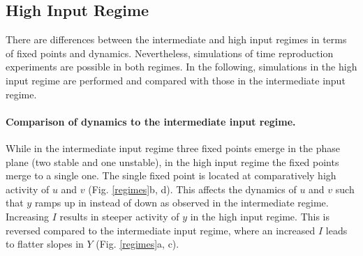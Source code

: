 \documentclass[10pt]{article}
\begin{document}
\subsection{High Input Regime}
There are differences between the intermediate and high input regimes in terms of fixed points and dynamics.
Nevertheless, simulations of time reproduction experiments are possible in both regimes. 
In the following, simulations in the high input regime are performed and compared with those in the intermediate input regime.

\paragraph{Comparison of dynamics to the intermediate input regime.}
While in the intermediate input regime three fixed points emerge in the phase plane (two stable and one unstable), in the high input regime the fixed points merge to a single one. 
The single fixed point is located at comparatively high activity of $u$ and $v$ 
(Fig. \ref{regimes}b, d).
This affects the dynamics of $u$ and $v$ such that $y$ ramps up in instead of down as observed in the intermediate regime. 
Increasing $I$ results in steeper activity of $y$ in the high input regime. This is reversed compared to the intermediate input regime, where an increased $I$ leads to flatter slopes in $Y$ (Fig. \ref{regimes}a, c). 
\end{document}
